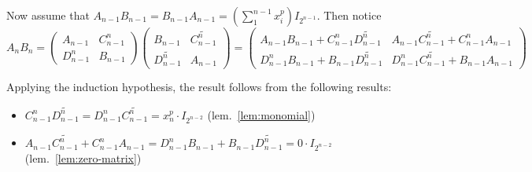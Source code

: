 \documentclass[12pt]{article}
\begin{document}
\begin{prf}
    Now assume that $A_{n-1}B_{n-1}=B_{n-1}A_{n-1}=(\sum_1^{n-1}x_i^p)I_{2^{n-1}}.$ Then notice
    \[A_nB_n=\begin{pmatrix}A_{n-1} & C_{n-1}^n\\D_{n-1}^n& B_{n-1}\end{pmatrix}\begin{pmatrix}B_{n-1}&\widetilde{C_{n-1}^n}\\ \widetilde{D_{n-1}^n} & A_{n-1}\end{pmatrix}=\begin{pmatrix}A_{n-1}B_{n-1}+C_{n-1}^n\widetilde{D_{n-1}^n} & A_{n-1}\widetilde{C_{n-1}^n}+C_{n-1}^nA_{n-1}\\
    D_{n-1}^nB_{n-1}+B_{n-1}\widetilde{D_{n-1}^n} & D_{n-1}^n\widetilde{C_{n-1}^n}+B_{n-1}A_{n-1}\end{pmatrix}\]
    
    Applying the induction hypothesis, the result follows from the following results:
    \begin{itemize}
        \item $C_{n-1}^n\widetilde{D_{n-1}^n}=D_{n-1}^n\widetilde{C_{n-1}^n}=x_n^p\cdot I_{2^{n-2}}$ (lem.~\ref{lem:monomial})
        \item $A_{n-1}\widetilde{C_{n-1}^n}+C_{n-1}^nA_{n-1} = D_{n-1}^nB_{n-1}+B_{n-1}\widetilde{D_{n-1}^n}=0\cdot I_{2^{n-2}}$ (lem.~\ref{lem:zero-matrix})
    \end{itemize}
    \end{prf}
    
\end{document}

